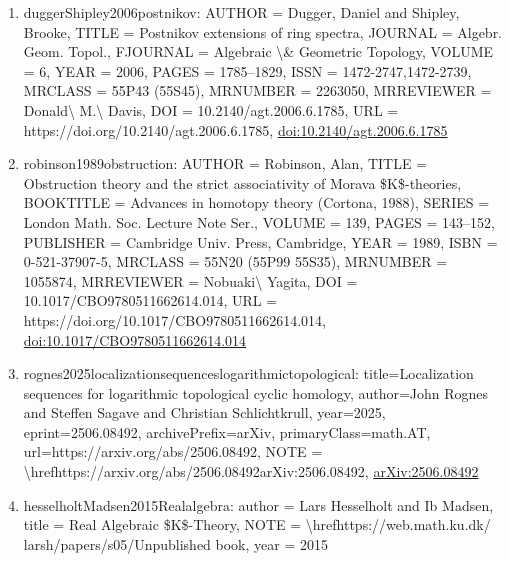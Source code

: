 \documentclass[11pt]{article}
\begin{document}
\begin{enumerate}[leftmargin=*]
  \item duggerShipley2006postnikov: AUTHOR = Dugger, Daniel and Shipley, Brooke, TITLE = Postnikov extensions of ring spectra, JOURNAL = Algebr. Geom. Topol., FJOURNAL = Algebraic \textbackslash{}\& Geometric Topology, VOLUME = 6, YEAR = 2006, PAGES = 1785--1829, ISSN = 1472-2747,1472-2739, MRCLASS = 55P43 (55S45), MRNUMBER = 2263050, MRREVIEWER = Donald\textbackslash{} M.\textbackslash{} Davis, DOI = 10.2140/agt.2006.6.1785, URL = https://doi.org/10.2140/agt.2006.6.1785, \href{https://doi.org/10.2140/agt.2006.6.1785}{doi:10.2140/agt.2006.6.1785}
  \item robinson1989obstruction: AUTHOR = Robinson, Alan, TITLE = Obstruction theory and the strict associativity of Morava \$K\$-theories, BOOKTITLE = Advances in homotopy theory (Cortona, 1988), SERIES = London Math. Soc. Lecture Note Ser., VOLUME = 139, PAGES = 143--152, PUBLISHER = Cambridge Univ. Press, Cambridge, YEAR = 1989, ISBN = 0-521-37907-5, MRCLASS = 55N20 (55P99 55S35), MRNUMBER = 1055874, MRREVIEWER = Nobuaki\textbackslash{} Yagita, DOI = 10.1017/CBO9780511662614.014, URL = https://doi.org/10.1017/CBO9780511662614.014, \href{https://doi.org/10.1017/CBO9780511662614.014}{doi:10.1017/CBO9780511662614.014}
  \item rognes2025localizationsequenceslogarithmictopological: title=Localization sequences for logarithmic topological cyclic homology, author=John Rognes and Steffen Sagave and Christian Schlichtkrull, year=2025, eprint=2506.08492, archivePrefix=arXiv, primaryClass=math.AT, url=https://arxiv.org/abs/2506.08492, NOTE = \textbackslash{}hrefhttps://arxiv.org/abs/2506.08492arXiv:2506.08492, \href{https://arxiv.org/abs/2506.08492}{arXiv:2506.08492}
  \item hesselholtMadsen2015Realalgebra: author = Lars Hesselholt and Ib Madsen, title = Real Algebraic \$K\$-Theory, NOTE = \textbackslash{}hrefhttps://web.math.ku.dk/ larsh/papers/s05/Unpublished book, year = 2015
\end{enumerate}

% 
% 
\end{document}
